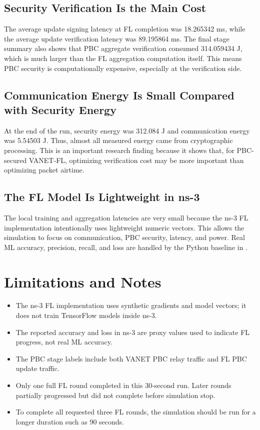 \documentclass[11pt,a4paper]{article}
\newcommand{\codepath}[1]{\path{#1}}
\begin{document}
\subsection{Security Verification Is the Main Cost}

The average update signing latency at FL completion was 18.265342 ms, while the
average update verification latency was 89.195864 ms. The final stage summary
also shows that PBC aggregate verification consumed 314.059434 J, which is much
larger than the FL aggregation computation itself. This means PBC security is
computationally expensive, especially at the verification side.

\subsection{Communication Energy Is Small Compared with Security Energy}

At the end of the run, security energy was 312.084 J and communication energy
was 5.54503 J. Thus, almost all measured energy came from cryptographic
processing. This is an important research finding because it shows that, for
PBC-secured VANET-FL, optimizing verification cost may be more important than
optimizing packet airtime.

\subsection{The FL Model Is Lightweight in ns-3}

The local training and aggregation latencies are very small because the ns-3 FL
implementation intentionally uses lightweight numeric vectors. This allows the
simulation to focus on communication, PBC security, latency, and power. Real ML
accuracy, precision, recall, and loss are handled by the Python baseline in
\codepath{Federated-Learning-VANET}.

\section{Limitations and Notes}

\begin{itemize}[leftmargin=*]
  \item The ns-3 FL implementation uses synthetic gradients and model vectors; it does not train TensorFlow models inside ns-3.
  \item The reported accuracy and loss in ns-3 are proxy values used to indicate FL progress, not real ML accuracy.
  \item The PBC stage labels include both VANET PBC relay traffic and FL PBC update traffic.
  \item Only one full FL round completed in this 30-second run. Later rounds partially progressed but did not complete before simulation stop.
  \item To complete all requested three FL rounds, the simulation should be run for a longer duration such as 90 seconds.
\end{itemize}
\end{document}
